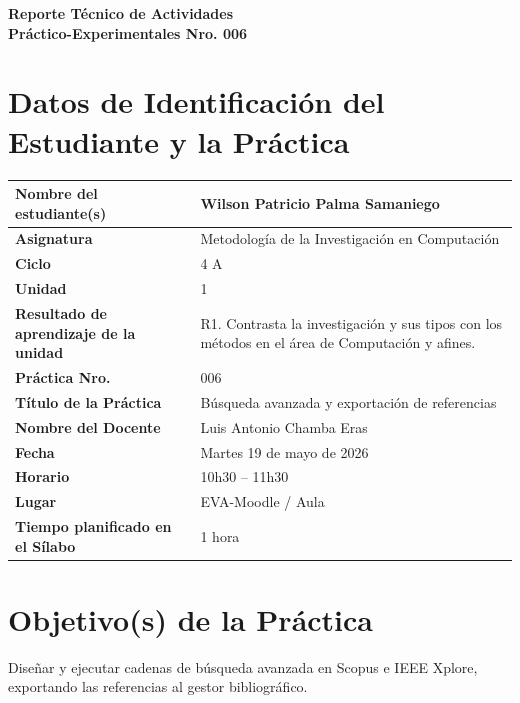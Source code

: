 \documentclass[11pt,a4paper]{article}
\begin{document}
\thispagestyle{fancy}

\vspace*{0.15cm}

\begin{center}
{\bfseries\fontsize{23}{26}\selectfont
Reporte Técnico de Actividades\\
Práctico-Experimentales Nro. 006\par}
\end{center}

\section{Datos de Identificación del Estudiante y la Práctica}

\noindent
\begin{tabularx}{\textwidth}{|L{0.43\textwidth}|Y|}
\hline
\textbf{Nombre del estudiante(s)} & Wilson Patricio Palma Samaniego \\ \hline
\textbf{Asignatura} & Metodología de la Investigación en Computación \\ \hline
\textbf{Ciclo} & 4 A \\ \hline
\textbf{Unidad} & 1 \\ \hline
\textbf{Resultado de aprendizaje de la unidad} & R1. Contrasta la investigación y sus tipos con los métodos en el área de Computación y afines. \\ \hline
\textbf{Práctica Nro.} & 006 \\ \hline
\textbf{Título de la Práctica} & Búsqueda avanzada y exportación de referencias \\ \hline
\textbf{Nombre del Docente} & Luis Antonio Chamba Eras \\ \hline
\textbf{Fecha} & Martes 19 de mayo de 2026 \\ \hline
\textbf{Horario} & 10h30 -- 11h30 \\ \hline
\textbf{Lugar} & EVA-Moodle / Aula \\ \hline
\textbf{Tiempo planificado en el Sílabo} & 1 hora \\ \hline
\end{tabularx}

\section{Objetivo(s) de la Práctica}
Diseñar y ejecutar cadenas de búsqueda avanzada en Scopus e IEEE Xplore, exportando las referencias al gestor bibliográfico.
\end{document}
